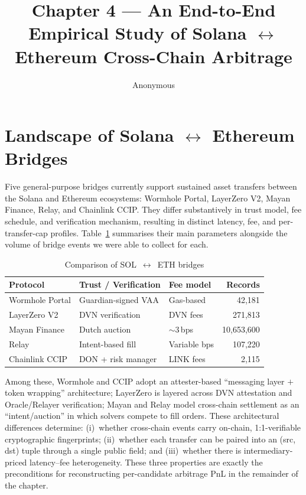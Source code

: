 \documentclass[sigconf,nonacm,10pt]{acmart}
\title{Chapter 4 --- An End-to-End Empirical Study of Solana $\leftrightarrow$ Ethereum Cross-Chain Arbitrage}
\author{Anonymous}
\affiliation{\institution{-}\country{-}}
\begin{document}
\maketitle

\section{Landscape of Solana $\leftrightarrow$ Ethereum Bridges}
\label{sec:bridges}

Five general-purpose bridges currently support sustained asset transfers
between the Solana and Ethereum ecosystems: Wormhole Portal, LayerZero
V2, Mayan Finance, Relay, and Chainlink CCIP. They differ substantively
in trust model, fee schedule, and verification mechanism, resulting in
distinct latency, fee, and per-transfer-cap profiles.
Table~\ref{tab:bridges} summarises their main parameters alongside the
volume of bridge events we were able to collect for each.

\begin{table}[h]
  \centering
  \small
  \caption{Comparison of SOL~$\leftrightarrow$~ETH bridges}
  \label{tab:bridges}
  \begin{tabular}{lllr}
    \toprule
    \textbf{Protocol} & \textbf{Trust / Verification} & \textbf{Fee model} & \textbf{Records} \\
    \midrule
    Wormhole Portal   & Guardian-signed VAA        & Gas-based           & 42{,}181 \\
    LayerZero V2      & DVN verification           & DVN fees            & 271{,}813 \\
    Mayan Finance     & Dutch auction              & $\sim$3\,bps        & 10{,}653{,}600 \\
    Relay             & Intent-based fill          & Variable bps        & 107{,}220 \\
    Chainlink CCIP    & DON + risk manager         & LINK fees           & 2{,}115 \\
    \bottomrule
  \end{tabular}
\end{table}

Among these, Wormhole and CCIP adopt an attester-based ``messaging
layer $+$ token wrapping'' architecture; LayerZero is layered across
DVN attestation and Oracle/Relayer verification; Mayan and Relay
model cross-chain settlement as an ``intent/auction'' in which solvers
compete to fill orders. These architectural differences determine:
(i)~whether cross-chain events carry on-chain, 1:1-verifiable
cryptographic fingerprints; (ii)~whether each transfer can be paired
into an (src, dst) tuple through a single public field; and
(iii)~whether there is intermediary-priced latency--fee heterogeneity.
These three properties are exactly the preconditions for reconstructing
per-candidate arbitrage PnL in the remainder of the chapter.
\end{document}
